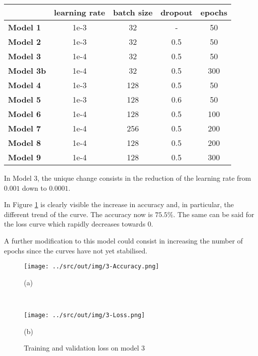 \documentclass[a4paper,12pt]{article} %
\begin{document}
	\begin{table}[H]
		\centering
		\begin{tabular}{l@{\hspace{.5cm}}cccc}
			\toprule
			& \textbf{learning rate} & \textbf{batch size} & \textbf{dropout} & 
			\textbf{epochs} \\
			\midrule
			\textbf{Model 1} & {1e-3} & {32}  &  -  & 50\\
			\textbf{Model 2} & {1e-3} & {32}  & 0.5 & 50\\
			\textbf{Model 3} & {1e-4} & {32}  & 0.5 & 50 \\
			\textbf{Model 3b} & {1e-4} & {32} & 0.5 & 300 \\
			\textbf{Model 4} & {1e-3} & {128} & 0.5 & 50 \\
			\textbf{Model 5} & {1e-3} & {128} & 0.6 & 50 \\
			\textbf{Model 6} & {1e-4} & {128} & 0.5 & 100 \\
			\textbf{Model 7} & {1e-4} & {256} & 0.5 & 200 \\
			\textbf{Model 8} & {1e-4} & {128} & 0.5 & 200 \\
			\textbf{Model 9} & {1e-4} & {128} & 0.5 & 300 \\
			\bottomrule 
		\end{tabular}
		\label{tab:param}
	\end{table}

	In Model 3, the unique change consists in the reduction of the learning 
	rate from $0.001$ down to $0.0001$. 
	
	In Figure \ref{fig:model3-performance} is clearly visible the increase 
	in accuracy and, in particular, the different trend of the curve. The 
	accuracy now is $75.5\%$.
	The same can be said for the loss curve which rapidly decreases towards $0$.
	
	A further modification to this model could consist in increasing the 
	number of epochs since the curves have not yet stabilised.
	
	\begin{figure}[htb]
		\begin{minipage}[c]{.49\textwidth}
			\centering
			\texttt{[image: ../src/out/img/3-Accuracy.png]}
			\caption*{(a)}
		\end{minipage}
		~
		\begin{minipage}[c]{.49\textwidth}
			\centering
			\texttt{[image: ../src/out/img/3-Loss.png]}
			\caption*{(b)}
		\end{minipage}
		\caption{Training and validation loss on model 3}
		\label{fig:model3-performance}
	\end{figure}
	
\end{document}
